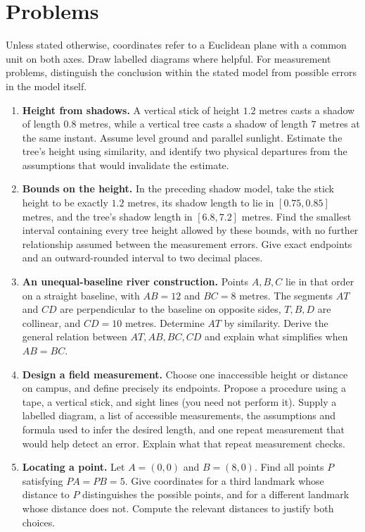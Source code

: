\section*{Problems}
Unless stated otherwise, coordinates refer to a Euclidean plane with a
common unit on both axes. Draw labelled diagrams where helpful. For
measurement problems, distinguish the conclusion within the stated model
from possible errors in the model itself.
\begin{enumerate}
\setlength{\itemsep}{0pt}
\setlength{\parsep}{0pt}
\item \textbf{Height from shadows.} A vertical stick of height $1.2$ metres
casts a shadow of length $0.8$ metres, while a vertical tree casts a shadow
of length $7$ metres at the same instant. Assume level ground and parallel
sunlight. Estimate the tree's height using similarity, and identify two
physical departures from the assumptions that would invalidate the estimate.

\item \textbf{Bounds on the height.} In the preceding shadow model, take
the stick height to be exactly $1.2$ metres, its shadow length to lie in
$[0.75,0.85]$ metres, and the tree's shadow length in $[6.8,7.2]$ metres.
Find the smallest interval containing every tree height allowed by these
bounds, with no further relationship assumed between the measurement errors.
Give exact endpoints and an outward-rounded interval to two decimal places.

\item \textbf{An unequal-baseline river construction.} Points $A,B,C$
lie in that order on a straight baseline, with $AB=12$ and $BC=8$ metres.
The segments $AT$ and $CD$ are perpendicular to the baseline on opposite
sides, $T,B,D$ are collinear, and $CD=10$ metres. Determine $AT$ by
similarity. Derive the general relation between $AT,AB,BC,CD$ and explain
what simplifies when $AB=BC$.

\item \textbf{Design a field measurement.} Choose one inaccessible height
or distance on campus, and define precisely its endpoints. Propose a
procedure using a tape, a vertical stick, and sight lines (you need not
perform it). Supply a labelled diagram, a list of accessible measurements,
the assumptions and formula used to infer the desired length, and one
repeat measurement that would help detect an error. Explain what that
repeat measurement checks.

\item \textbf{Locating a point.} Let $A=(0,0)$ and
$B=(8,0)$. Find all points $P$ satisfying $PA=PB=5$. Give coordinates for a third landmark whose distance to $P$
distinguishes the possible points, and for a different landmark whose
distance does not. Compute the relevant distances to justify both choices.


\end{enumerate}
